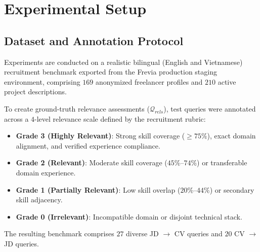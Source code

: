 \documentclass[runningheads]{llncs}
\begin{document}
\section{Experimental Setup}

\subsection{Dataset and Annotation Protocol}
Experiments are conducted on a realistic bilingual (English and Vietnamese) recruitment benchmark exported from the Frevia production staging environment, comprising $169$ anonymized freelancer profiles and $210$ active project descriptions. 

To create ground-truth relevance assessments ($\mathcal{Q}_{rels}$), test queries were annotated across a $4$-level relevance scale defined by the recruitment rubric:
\begin{itemize}
    \item \textbf{Grade 3 (Highly Relevant)}: Strong skill coverage ($\ge 75\%$), exact domain alignment, and verified experience compliance.
    \item \textbf{Grade 2 (Relevant)}: Moderate skill coverage ($45\%$--$74\%$) or transferable domain experience.
    \item \textbf{Grade 1 (Partially Relevant)}: Low skill overlap ($20\%$--$44\%$) or secondary skill adjacency.
    \item \textbf{Grade 0 (Irrelevant)}: Incompatible domain or disjoint technical stack.
\end{itemize}
The resulting benchmark comprises $27$ diverse JD $\rightarrow$ CV queries and $20$ CV $\rightarrow$ JD queries.
\end{document}
